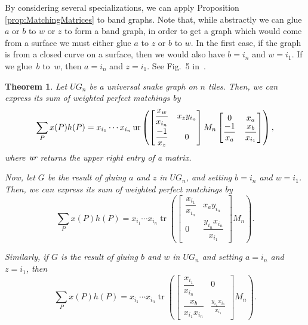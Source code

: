 \documentclass[pdftex]{sigma}%
\numberwithin{equation}{section}
\newtheorem{Theorem}{Theorem}[section]
\begin{document}
By considering several specializations, we can apply Proposition \ref{prop:MatchingMatrices} to band graphs. Note that, while abstractly we can glue $a$ or $b$ to $w$ or $z$ to form a band graph, in order to get a graph which would come from a surface we must either glue $a$ to $z$ or $b$ to $w$. In the first case, if the graph is from a closed curve on a surface, then we would also have $b = i_n$ and $w = i_1$. If we glue~$b$ to~$w$, then $a = i_n$ and $z = i_1$. See Fig.~5 in~\cite{MW}.

\begin{Theorem}\label{thm:upperright}
Let $UG_n$ be a universal snake graph on $n$ tiles. Then, we can express its sum of weighted perfect matchings by{\samepage \[
\sum_P x(P) h(P) = x_{i_1} \cdots x_{i_n} \operatorname{ur} \left( \begin{bmatrix} \dfrac{x_w}{x_{i_n}} & x_z y_{i_n} \vspace{1mm}\\ \dfrac{-1}{x_z} & 0 \end{bmatrix} M_n \begin{bmatrix} 0 & x_a \\ \dfrac{-1}{x_a} & \dfrac{x_b}{x_{i_1}} \end{bmatrix}\right),
\]
where $\emph{ur}$ returns the upper right entry of a matrix.}

Now, let $G$ be the result of gluing $a$ and $z$ in $UG_n$, and setting $b = i_n$ and $w = i_1$. Then, we can express its sum of weighted perfect matchings by\[
\sum_P x(P) h(P) = x_{i_1} \cdots x_{i_n} \operatorname{tr} \left( \begin{bmatrix} \dfrac{x_{i_1}}{x_{i_n}} & x_a y_{i_n} \\ 0 & \dfrac{y_{i_n} x_{i_n}}{x_{i_1}} \end{bmatrix} M_n \right).
\]

Similarly, if $G$ is the result of gluing $b$ and $w$ in $UG_n$ and setting $a = i_n$ and $z = i_1$, then
\[
\sum_P x(P) h(P) = x_{i_1} \cdots x_{i_n} \operatorname{tr} \left( \begin{bmatrix} \dfrac{x_{i_1}}{x_{i_n}} & 0 \\ \dfrac{x_b}{x_{i_1}x_{i_n}} & \frac{y_{i_n} x_{i_n}}{x_{i_1}} \end{bmatrix} M_n \right).
\]
\end{Theorem}
\end{document}
